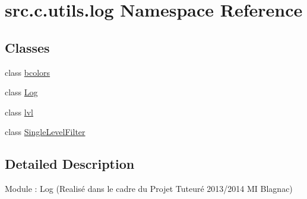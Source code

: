 \hypertarget{namespacesrc_1_1c_1_1utils_1_1log}{}\section{src.\+c.\+utils.\+log Namespace Reference}
\label{namespacesrc_1_1c_1_1utils_1_1log}
\subsection*{Classes}
\begin{DoxyCompactItemize}
\item 
class \hyperlink{classsrc_1_1c_1_1utils_1_1log_1_1bcolors}{bcolors}
\item 
class \hyperlink{classsrc_1_1c_1_1utils_1_1log_1_1_log}{Log}
\item 
class \hyperlink{classsrc_1_1c_1_1utils_1_1log_1_1lvl}{lvl}
\item 
class \hyperlink{classsrc_1_1c_1_1utils_1_1log_1_1_single_level_filter}{Single\+Level\+Filter}
\end{DoxyCompactItemize}


\subsection{Detailed Description}
\begin{DoxyVerb}    Module : Log
    (Realisé dans le cadre du Projet Tuteuré 2013/2014 MI Blagnac)
\end{DoxyVerb}
 